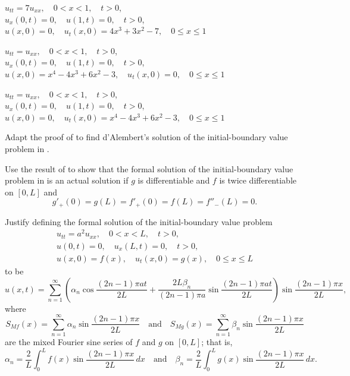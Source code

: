 \begin{exerciselist}
\item\label{exer:12.2.29}\Cex
$u_{tt}=7u_{xx},\quad 0<x<1,\quad t>0$,\\
$u_x(0,t)=0,\quad u(1,t)=0,\quad t>0$,\\
$u(x,0)=0,\quad u_t(x,0)=4x^3+3x^2-7,\quad0\le x\le1$

\item\label{exer:12.2.30}$u_{tt}=u_{xx},\quad 0<x<1,\quad t>0$,\\
$u_x(0,t)=0,\quad u(1,t)=0,\quad t>0$,\\
$u(x,0)=x^4-4x^3+6x^2-3,\quad u_t(x,0)=0,\quad0\le x\le1$


\item\label{exer:12.2.31}$u_{tt}=u_{xx},\quad 0<x<1,\quad t>0$,\\
$u_x(0,t)=0,\quad u(1,t)=0,\quad t>0$,\\
$u(x,0)=0,\quad u_t(x,0)=x^4-4x^3+6x^2-3,\quad0\le x\le1$


\item\label{exer:12.2.32}Adapt the proof of 
to find d'Alembert's solution of the initial-boundary value problem
in .

\item\label{exer:12.2.33}Use the result of  to show that the formal
solution of the initial-boundary value problem in
is an actual solution if $g$ is differentiable and $f$ is twice
differentiable on $[0,L]$ and
\[
g'_+(0)=g(L)=f'_+(0)=f(L)=f''_-(L)=0.
\]

\item\label{exer:12.2.34}Justify  defining the formal solution of the initial-boundary
value problem
\begin{gather*}
u_{tt}=a^2u_{xx},\quad 0<x<L,\quad t>0,\\
 u(0,t)=0,\quad u_x(L,t)=0,\quad t>0,\\
u(x,0)=f(x),\quad u_t(x,0)=g(x),\quad 0\le x\le L
\end{gather*}
to be
\[
u(x,t)=\sum_{n=1}^\infty
\left(\alpha_n\cos\frac{(2n-1)\pi a
t}{2L}+\frac{2L\beta_n}{(2n-1)\pi a}\sin\frac{(2n-1)\pi
at}{2L}\right)
\sin\frac{(2n-1)\pi x}{2L},
\]
where
\[
S_{M\!f}(x)=\sum_{n=1}^\infty\alpha_n\sin\frac{(2n-1)\pi x}{2L}
\quad\text{and}\quad
S_{M\!g}(x)=\sum_{n=1}^\infty\beta_n\sin\frac{(2n-1)\pi x}{2L}
\]
are the mixed Fourier sine series of $f$ and $g$
on $[0,L]$; that is,
\[
\alpha_n=\frac{2}{L}\int_0^Lf(x)\sin\frac{(2n-1)\pi x}{2L}\,dx
\quad\text{and}\quad
\beta_n=\frac{2}{L}\int_0^Lg(x)\sin\frac{(2n-1)\pi x}{2L}\,dx.
\]




\end{exerciselist}
